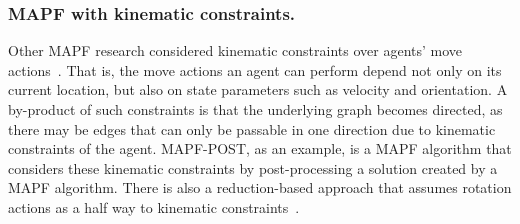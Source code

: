 \documentclass[letterpaper]{article} %
\newcommand{\mapf}{\ac{MAPF}\xspace}
\newcommand{\comment}[1]{{\nb{\textbf{Comment:}}{orange}{#1}}}
\begin{document}
\subsubsection{\mapf with kinematic constraints.} 
Other \mapf research considered kinematic constraints over agents' move actions~\cite{honig2017summary,walker17hierarchical}. That is, the move actions an agent can perform depend not only on its current location, but also on state parameters such as velocity and orientation. A by-product of such constraints is that the underlying graph becomes directed, as there may be edges that can only be passable in one direction due to kinematic constraints of the agent.  MAPF-POST, as an example, is a \mapf algorithm that considers these kinematic constraints by post-processing a solution created by a \mapf algorithm. There is also a reduction-based approach that assumes rotation actions as a half way to kinematic constraints~\cite{BartakIBERAMIA18}.





\end{document}

